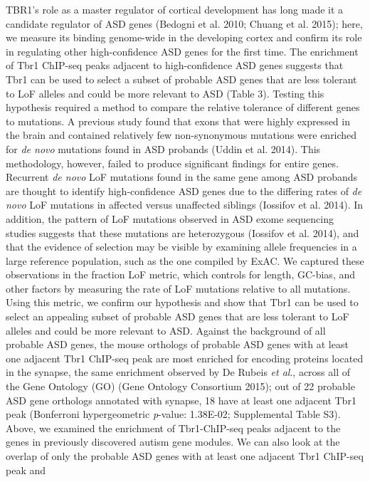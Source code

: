 \documentclass[]{article}
\begin{document}
TBR1's role as a master regulator of cortical development has long made
it a candidate regulator of ASD genes (Bedogni et al. 2010; Chuang et
al. 2015); here, we measure its binding genome-wide in the developing
cortex and confirm its role in regulating other high-confidence ASD
genes for the first time. The enrichment of Tbr1 ChIP-seq peaks adjacent
to high-confidence ASD genes suggests that Tbr1 can be used to select a
subset of probable ASD genes that are less tolerant to LoF alleles and
could be more relevant to ASD (Table 3). Testing this hypothesis
required a method to compare the relative tolerance of different genes
to mutations. A previous study found that exons that were highly
expressed in the brain and contained relatively few non-synonymous
mutations were enriched for \emph{de novo} mutations found in ASD
probands (Uddin et al. 2014). This methodology, however, failed to
produce significant findings for entire genes. Recurrent \emph{de novo}
LoF mutations found in the same gene among ASD probands are thought to
identify high-confidence ASD genes due to the differing rates of
\emph{de novo} LoF mutations in affected versus unaffected siblings
(Iossifov et al. 2014). In addition, the pattern of LoF mutations
observed in ASD exome sequencing studies suggests that these mutations
are heterozygous (Iossifov et al. 2014), and that the evidence of
selection may be visible by examining allele frequencies in a large
reference population, such as the one compiled by ExAC. We captured
these observations in the fraction LoF metric, which controls for
length, GC-bias, and other factors by measuring the rate of LoF
mutations relative to all mutations. Using this metric, we confirm our
hypothesis and show that Tbr1 can be used to select an appealing subset
of probable ASD genes that are less tolerant to LoF alleles and could be
more relevant to ASD. Against the background of all probable ASD genes,
the mouse orthologs of probable ASD genes with at least one adjacent
Tbr1 ChIP-seq peak are most enriched for encoding proteins located in
the synapse, the same enrichment observed by De Rubeis \emph{et al}.,
across all of the Gene Ontology (GO) (Gene Ontology Consortium 2015);
out of 22 probable ASD gene orthologs annotated with synapse, 18 have at
least one adjacent Tbr1 peak (Bonferroni hypergeometric \emph{p}-value:
1.38E-02; Supplemental Table S3). Above, we examined the enrichment of
Tbr1-ChIP-seq peaks adjacent to the genes in previously discovered
autism gene modules. We can also look at the overlap of only the
probable ASD genes with at least one adjacent Tbr1 ChIP-seq peak and
\end{document}

